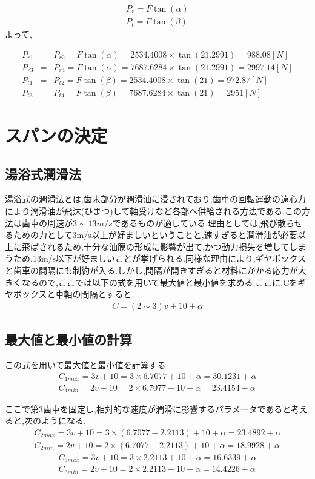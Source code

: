 \begin{eqnarray}
P_r = F\tan(\alpha)\\
P_t = F\tan(\beta)
\end{eqnarray}
よって,

\begin{eqnarray}
P_{r1} &=&P_{r2} = F\tan(\alpha) = 2534.4008 \times \tan(21.2991) = 988.08[N]\\
P_{r3} &=&P_{r4} = F\tan(\alpha) = 7687.6284 \times \tan(21.2991) = 2997.14[N]\\
P_{t1} &=&P_{t2} = F\tan(\beta) = 2534.4008 \times \tan(21) = 972.87[N]\\
P_{t3} &=&P_{t4} = F\tan(\beta) = 7687.6284 \times \tan(21) = 2951[N]
\end{eqnarray}

\section{スパンの決定}
\subsection{湯浴式潤滑法}
湯浴式の潤滑法とは,歯末部分が潤滑油に浸されており,歯車の回転運動の遠心力により潤滑油が飛沫(ひまつ)して軸受けなど各部へ供給される方法である.この方法は歯車の周速が$3\sim13m/s$であるものが適している.理由としては,飛び散らせるための力として3m/s以上が好ましいということと,速すぎると潤滑油が必要以上に飛ばされるため,十分な油膜の形成に影響が出て,かつ動力損失を増してしまうため,13m/s以下が好ましいことが挙げられる.同様な理由により,ギヤボックスと歯車の間隔にも制約が入る.しかし,間隔が開きすぎると材料にかかる応力が大きくなるので,ここでは以下の式を用いて最大値と最小値を求める.ここに,Cをギヤボックスと車軸の間隔とすると,
\begin{eqnarray}
C=(2\sim3)v+10 + \alpha
\end{eqnarray}
\subsection{最大値と最小値の計算}
この式を用いて最大値と最小値を計算する
\begin{eqnarray}
C_{1max}=3v+10=3 \times 6.7077 + 10 +\alpha = 30.1231 +\alpha\\
C_{1min}=2v+10=2 \times 6.7077 + 10 +\alpha = 23.4154 +\alpha
\end{eqnarray}
\par
ここで第3歯車を固定し,相対的な速度が潤滑に影響するパラメータであると考えると,次のようになる.
\begin{eqnarray}
C_{2max}=3v+10=3 \times (6.7077-2.2113) + 10 +\alpha = 23.4892 +\alpha\\
C_{2min}=2v+10=2 \times (6.7077-2.2113) + 10 +\alpha = 18.9928 +\alpha
\end{eqnarray}
\begin{eqnarray}
C_{3max}=3v+10=3 \times 2.2113 + 10 +\alpha = 16.6339 +\alpha\\
C_{3min}=2v+10=2 \times 2.2113 + 10 +\alpha = 14.4226 +\alpha
\end{eqnarray}
